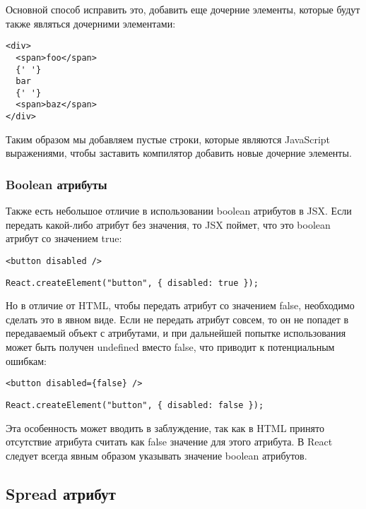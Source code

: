 Основной способ исправить это, добавить еще дочерние элементы, которые будут также являться дочерними элементами:

\begin{lstlisting}
<div>
  <span>foo</span>
  {' '}
  bar
  {' '}
  <span>baz</span>
</div>
\end{lstlisting}

Таким образом мы добавляем пустые строки, которые являются JavaScript выражениями, чтобы заставить компилятор добавить новые дочерние элементы.

\subsubsection*{Boolean атрибуты}

Также есть небольшое отличие в использовании boolean атрибутов в JSX. Если передать какой-либо атрибут без значения, то JSX поймет, что это boolean атрибут со значением true:

\begin{lstlisting}
<button disabled />
\end{lstlisting}

\begin{lstlisting}
React.createElement("button", { disabled: true });
\end{lstlisting}
   
Но в отличие от HTML, чтобы передать атрибут со значением false, необходимо сделать это в явном виде. Если не передать атрибут совсем, то он не попадет в передаваемый объект с атрибутами, и при дальнейшей попытке использования может быть получен undefined вместо false, что приводит к потенциальным ошибкам:

\begin{lstlisting}
<button disabled={false} />
\end{lstlisting}

\begin{lstlisting}
React.createElement("button", { disabled: false });
\end{lstlisting}
   
Эта особенность может вводить в заблуждение, так как в HTML принято отсутствие атрибута считать как false значение для этого атрибута. В React следует всегда явным образом указывать значение boolean атрибутов.

\subsection*{Spread атрибут}

